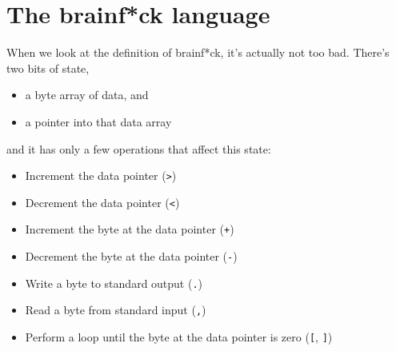 \documentclass{article}
\begin{document}
\section{The brainf*ck language}
When we look at the definition of brainf*ck, it's actually not too bad. There's two bits of state,

\begin{itemize}
\item a byte array of data, and
\item a pointer into that data array
\end{itemize}
%
and it has only a few operations that affect this state:
\begin{itemize}
\item Increment the data pointer (\verb|>|)

\item Decrement the data pointer (\verb|<|)

\item Increment the byte at the data pointer (\verb|+|)

\item Decrement the byte at the data pointer (\verb|-|)

\item Write a byte to standard output (\verb|.|)

\item Read a byte from standard input (\verb|,|)

\item Perform a loop until the byte at the data pointer is zero (\verb|[|, \verb|]|)
\end{itemize}
\end{document}
